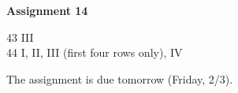 \documentclass[12pt]{letter}
\begin{document}
\textbf{Assignment 14}

43 III\\
44 I, II, III (first four rows only), IV

The assignment is due tomorrow (Friday, 2/3).
\end{document}
